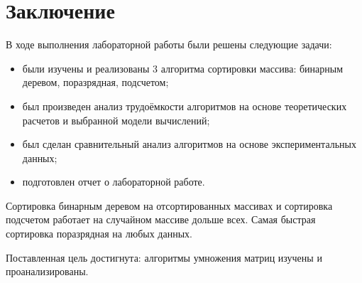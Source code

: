 \chapter*{Заключение}

В ходе выполнения лабораторной работы были решены следующие задачи:

\begin{itemize}
	\item были изучены и реализованы 3 алгоритма сортировки массива: бинарным деревом, поразрядная, подсчетом;
	
	\item был произведен анализ трудоёмкости алгоритмов на основе теоретических расчетов и выбранной модели вычислений;
	\item был сделан сравнительный анализ алгоритмов на основе экспериментальных данных;
	
	\item подготовлен отчет о лабораторной работе.
\end{itemize}

Сортировка бинарным деревом на отсортированных массивах и сортировка подсчетом работает на случайном массиве дольше всех.
Самая быстрая сортировка поразрядная на любых данных.

Поставленная цель достигнута: алгоритмы умножения матриц изучены и проанализированы.